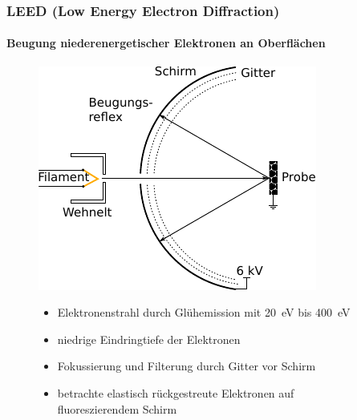 \documentclass{beamer}
\begin{document}
\begin{frame}
\frametitle{LEED (Low Energy Electron Diffraction)}
\framesubtitle{Beugung niederenergetischer Elektronen an Oberflächen}
\begin{figure}[htbp]
	\begin{minipage}[b]{0.45\textwidth}
		\includegraphics[]{bilder/leedkleiner}
	\end{minipage}
	\hspace{0.4cm}
	\begin{minipage}[b]{0.45\textwidth}
		\begin{itemize}
 		\item Elektronenstrahl durch Glühemission mit \SI{20}{eV} bis \SI{400}{eV}
 	 	\item niedrige Eindringtiefe der Elektronen
 	 	\item Fokussierung und Filterung durch Gitter vor Schirm
 	 	\item betrachte elastisch rückgestreute Elektronen auf fluoreszierendem Schirm
		\end{itemize}
	\end{minipage}
\end{figure}
\end{frame}
\end{document}
